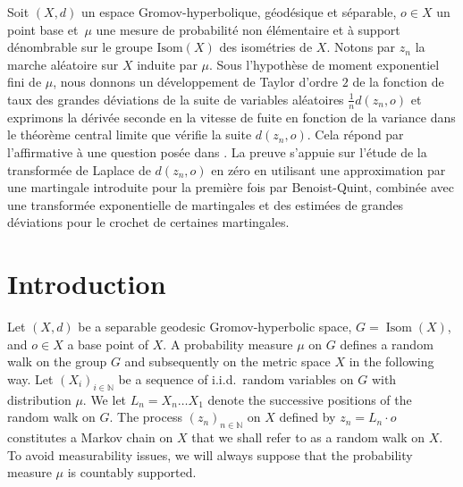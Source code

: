 \documentclass[JEP,XML,SOM,Unicode,published]{cedram}
\theoremstyle{plain}
\theoremstyle{definition}
\newcommand\N{\mathbb{N}}
\DeclareMathOperator\Isom{Isom}
\begin{document}

\begin{altabstract}
Soit $(X,d)$ un espace Gromov-hyperbolique, géodésique et séparable, $o \in X$ un point base et~$\mu$ une mesure de probabilité non élémentaire et à support dénombrable sur le groupe $\mathrm{Isom}(X)$ des isométries de $X$. Notons par $z_n$ la marche aléatoire sur $X$ induite par $\mu$. 
Sous l'hypothèse de moment exponentiel fini de $\mu$, nous donnons un développement de Taylor d'ordre $2$ de la fonction de taux des grandes déviations de la suite de variables aléatoires $\frac{1}{n}d(z_n,o)$ et exprimons la dérivée seconde en la vitesse de fuite en fonction de la variance dans le théorème central limite que vérifie la suite $d(z_n,o)$. Cela répond par l'affirmative à une question posée dans \cite{BMSS}. La preuve s'appuie sur l'étude de la transformée de Laplace de $d(z_n,o)$ en zéro en utilisant une approximation par une martingale introduite pour la première fois par Benoist-Quint, combinée avec une transformée exponentielle de martingales et des estimées de grandes déviations pour le crochet de certaines martingales.
\end{altabstract}
\maketitle

\tableofcontents


\section{Introduction}
Let $(X,d)$ be a separable geodesic Gromov-hyperbolic space,
$G=\Isom(X)$, and $o \in X$ a base point of $X$. A probability measure $\mu$ on $G$ defines a random walk on the group $G$ and subsequently on the metric space $X$ in the following way. Let $(X_i)_{i\in \N}$ be a sequence of i.i.d.~random variables on $G$ with distribution $\mu$. We let $L_n=X_n \dots X_1$ denote the successive positions of the random walk on $G$. The process $(z_n)_{n \in \N}$ on $X$ defined by $z_n=L_n \cdot o$ constitutes a Markov chain on $X$ that we shall refer to as a random walk on $X$. To avoid measurability issues, we will always suppose that the probability measure $\mu$ is countably supported.
\end{document}
